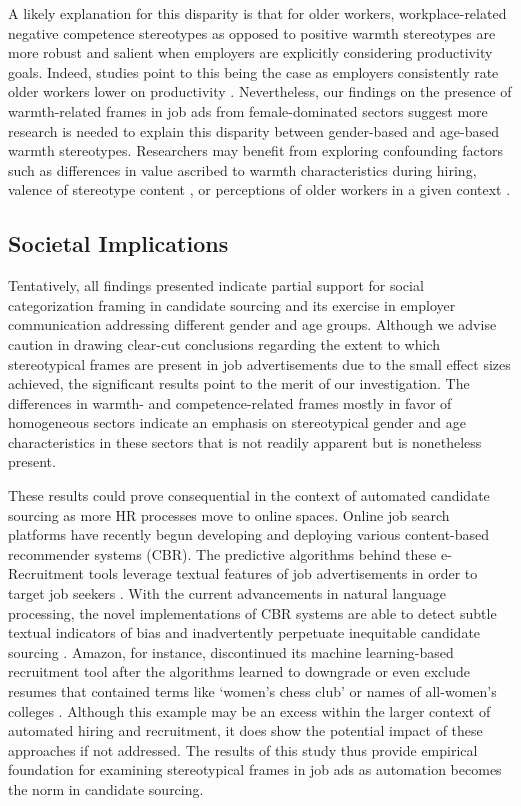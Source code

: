 \documentclass[Royal,sageapa,times]{sagej}
\begin{document}
A likely explanation for this disparity is that for older workers, workplace-related negative competence stereotypes as opposed to positive warmth stereotypes are more robust and salient when employers are explicitly considering productivity goals. Indeed, studies point to this being the case as employers consistently rate older workers lower on productivity . Nevertheless, our findings on the presence of warmth-related frames in job ads from female-dominated sectors suggest more research is needed to explain this disparity between gender-based and age-based warmth stereotypes. Researchers may benefit from exploring confounding factors such as differences in value ascribed to warmth characteristics during hiring, valence of stereotype content , or perceptions of older workers in a given context .

\subsection{Societal Implications\label{societal_implications}}
Tentatively, all findings presented indicate partial support for social categorization framing in candidate sourcing and its exercise in employer communication addressing different gender and age groups. Although we advise caution in drawing clear-cut conclusions regarding the extent to which stereotypical frames are present in job advertisements due to the small effect sizes achieved, the significant results point to the merit of our investigation. The differences in warmth- and competence-related frames mostly in favor of homogeneous sectors indicate an emphasis on stereotypical gender and age characteristics in these sectors that is not readily apparent but is nonetheless present.

These results could prove consequential in the context of automated candidate sourcing as more HR processes move to online spaces. Online job search platforms have recently begun developing and deploying various content-based recommender systems (CBR). The predictive algorithms behind these e-Recruitment tools leverage textual features of job advertisements in order to target job seekers . With the current advancements in natural language processing, the novel implementations of CBR systems are able to detect subtle textual indicators of bias and inadvertently perpetuate inequitable candidate sourcing . Amazon, for instance, discontinued its machine learning-based recruitment tool after the algorithms learned to downgrade or even exclude resumes that contained terms like ‘women’s chess club’ or names of all-women’s colleges . Although this example may be an excess within the larger context of automated hiring and recruitment, it does show the potential impact of these approaches if not addressed. The results of this study thus provide empirical foundation for examining stereotypical frames in job ads as automation becomes the norm in candidate sourcing.
\end{document}
